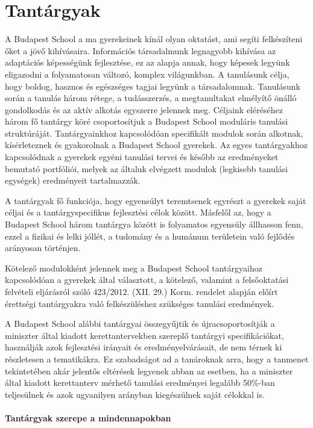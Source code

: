 \section{Tantárgyak}
\label{sec:tantargyak}
A Budapest School a ma gyerekeinek kínál olyan oktatást, ami segíti
felkészíteni őket a jövő kihívásaira. Információs társadalmunk legnagyobb
kihívása az adaptációs képességünk fejlesztése, ez az alapja annak, hogy
képesek legyünk eligazodni a folyamatosan változó, komplex világunkban. A
tanulásunk célja, hogy boldog, hasznos és egészséges tagjai legyünk a
társadalomnak. Tanulásunk során a tanulás három rétege, a tudásszerzés, a
megtanultakat elmélyítő önálló gondolkodás és az aktív alkotás egyszerre
jelennek meg. Céljaink eléréséhez három fő tantárgy köré csoportosítjuk a
Budapest School moduláris tanulási struktúráját. Tantárgyainkhoz kapcsolódóan
specifikált modulok során alkotnak, kísérleteznek és gyakorolnak a Budapest
School gyerekek. Az egyes tantárgyakhoz kapcsolódnak a gyerekek egyéni tanulási
tervei és később az eredményeket bemutató portfóliói, melyek az általuk
elvégzett modulok (legkisebb tanulási egységek) eredményeit tartalmazzák.

A tantárgyak fő funkciója, hogy egyensúlyt teremtsenek egyrészt a gyerekek
saját céljai és a tantárgyspecifikus fejlesztési célok között. Másfelől az,
hogy a Budapest School három tantárgya között is folyamatos egyensúly állhasson
fenn, ezzel a fizikai és lelki jóllét, a tudomány és a humánum területein való
fejlődés arányosan történjen.

Kötelező modulokként jelennek meg a Budapest School tantárgyaihoz kapcsolódóan
a gyerekek által választott, a kötelező, valamint a felsőoktatási felvételi
eljárásról szóló 423/2012. (XII. 29.) Korm. rendelet alapján előírt érettségi
tantárgyakra való felkészüléshez szükséges tanulási eredmények.

A Budapest School alábbi tantárgyai összegyűjtik és újracsoportosítják a
miniszter által kiadott kerettantervekben szereplő tantárgyi specifikációkat,
használják azok fejlesztési irányait és eredményelvárásait, de nem térnek ki
részletesen a tematikákra. Ez szabadságot ad a tanároknak arra, hogy a
tanmenet tekintetében akár jelentős eltérések legyenek abban az esetben, ha a
miniszter által kiadott kerettanterv mérhető tanulási eredményei legalább 50\%-ban
teljesülnek és azok ugyanilyen arányban kiegészülnek saját célokkal is.

\paragraph{Tantárgyak szerepe a mindennapokban}


